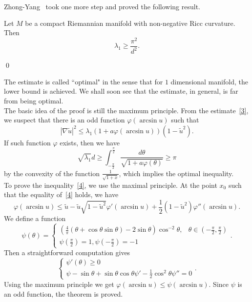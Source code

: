 Zhong-Yang~\cite{zhong-yang} took one more step and proved the following result.
\begin{theorem}
 Let $M$ be a compact Riemannian manifold with non-negative Ricc
curvature. Then
\[
\lambda_1 \geqslant \frac{\pi^2}{d^2}.
\]
\end{theorem}

\qed

The estimate is called ``optimal" in the sense that for $1$ dimensional 
manifold, the lower bound is achieved. We shall soon see that the estimate, in 
general, is far from being optimal.
\\

The basic idea of the proof is still the maximum principle. From the estimate~\eqref{3}, we suspect that there is an odd function $\varphi(\arcsin u)$
such that
\begin{equation}\label{4}
|\nabla\widetilde u|^2 \leqslant \lambda_1(1+a\varphi(\arcsin u))
(1 - \widetilde u^2).
\end{equation}
If such function $\varphi$ exists, then we have
\[
\sqrt{\lambda_1}d \geqslant \int_{-\frac{\pi}{2}}^{\frac{\pi}{2}}
\frac{d\theta}{\sqrt{1+a\varphi(\theta)}} \geqslant \pi
\]
by the convexity of the function $\frac{1}{\sqrt{1+x}}$, which implies the optimal inequality.
\\

To prove the inequality~\eqref{4}, we use the maximal principle. At the point
$x_0$ such that the equality of~\eqref{4} holds, we have
\[
\varphi(\arcsin u) \leqslant \widetilde u - \widetilde u 
\sqrt{1 - \widetilde u^2}\varphi '(\arcsin u) + \frac{1}{2}
(1 - \widetilde u^2)\varphi''(\arcsin u).
\]
We define a function
\[
\psi(\theta) = \left\{
\begin{array}{ll}
(\frac{4}{\pi}(\theta + \cos\theta\sin\theta)-2\sin\theta)\cos^{-2}\theta, &
\theta\in(-\frac{\pi}{2}, \frac{\pi}{2}) \\
\psi(\frac{\pi}{2}) = 1, \psi(-\frac{\pi}{2}) = -1
\end{array}
\right..
\]
Then a straightforward computation gives
\[
\left\{\begin{array}{l}
\psi '(\theta) \geqslant 0 \\
\psi - \sin\theta + \sin\theta\cos\theta\psi ' - 
\frac{1}{2}\cos^2\theta\psi'' = 0
\end{array}
\right..
\]
Using the maximum principle we get $\varphi(\arcsin u) \leqslant \psi(\arcsin u)$. 
Since $\psi$ is an odd function, the theorem is proved.
\\

